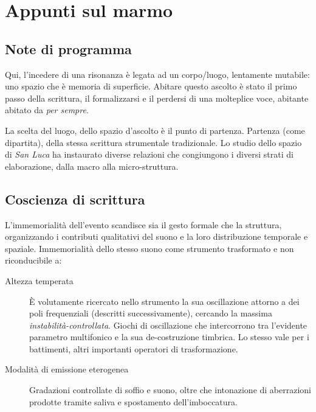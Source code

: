 
\chapter{Appunti sul marmo}
\label{cap:appunti}

\section{Note di programma}

Qui, l’incedere di una risonanza è legata ad un corpo/luogo, lentamente mutabile:
uno spazio che è memoria di superficie. Abitare questo ascolto è stato il primo
passo della scrittura, il formalizzarsi e il perdersi di una molteplice voce,
abitante abitato da \emph{per sempre}. 

La scelta del luogo, dello spazio d'ascolto è il punto di partenza.
Partenza (come dipartita), della stessa scrittura strumentale tradizionale. 
Lo studio dello spazio di \emph{San Luca} ha instaurato diverse relazioni che
congiungono i diversi strati di elaborazione, dalla macro alla micro-struttura.

\section{Coscienza di scrittura}

L'immemorialità dell'evento scandisce sia il gesto formale che la struttura,
organizzando i contributi qualitativi del suono e la loro distribuzione
temporale e spaziale. Immemorialità dello stesso suono come strumento trasformato
e non riconducibile a:

\begin{description}
	\item[ Altezza temperata ] È volutamente ricercato nello strumento la sua
	oscillazione  attorno a dei poli frequenziali (descritti successivamente),
	cercando la massima \emph{instabilità-controllata}. Giochi di oscillazione che
	intercorrono tra l’evidente parametro multifonico e la sua de-costruzione
	timbrica. Lo stesso vale per i battimenti, altri importanti operatori di
	trasformazione.
	\item[ Modalità di emissione eterogenea ] Gradazioni controllate di soffio e
	suono, oltre che intonazione di aberrazioni prodotte tramite saliva e
	spostamento dell'imboccatura.     
\end{description}

